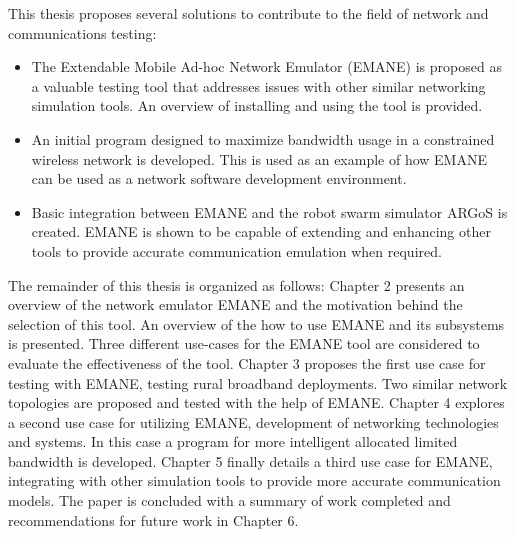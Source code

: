 This thesis proposes several solutions to contribute to the field of network and communications testing:
\begin{itemize}
    \item The Extendable Mobile Ad-hoc Network Emulator (EMANE) is proposed as a valuable testing tool that addresses issues with other similar networking simulation tools. An overview of installing and using the tool is provided.
    \item An initial program designed to maximize bandwidth usage in a constrained wireless network is developed. This is used as an example of how EMANE can be used as a network software development environment.
    \item Basic integration between EMANE and the robot swarm simulator ARGoS is created. EMANE is shown to be capable of extending and enhancing other tools to provide accurate communication emulation when required.
\end{itemize}\par

The remainder of this thesis is organized as follows:
Chapter 2 presents an overview of the network emulator EMANE and the motivation behind the selection of this tool. An overview of the how to use EMANE and its subsystems is presented.
Three different use-cases for the EMANE tool are considered to evaluate the effectiveness of the tool.
Chapter 3 proposes the first use case for testing with EMANE, testing rural broadband deployments. Two similar network topologies are proposed and tested with the help of EMANE.
Chapter 4 explores a second use case for utilizing EMANE, development of networking technologies and systems. In this case a program for more intelligent allocated limited bandwidth is developed.
Chapter 5 finally details a third use case for EMANE, integrating with other simulation tools to provide more accurate communication models.
The paper is concluded with a summary of work completed and recommendations for future work in Chapter 6.